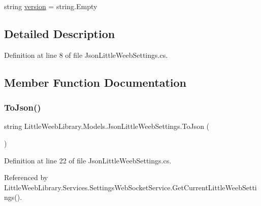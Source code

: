 \begin{DoxyCompactItemize}
\item 
string \mbox{\hyperlink{class_little_weeb_library_1_1_models_1_1_json_little_weeb_settings_adefa3710a72bdd1e1c864479218f0614}{version}} = string.\+Empty
\end{DoxyCompactItemize}


\subsection{Detailed Description}


Definition at line 8 of file Json\+Little\+Weeb\+Settings.\+cs.



\subsection{Member Function Documentation}
\mbox{\label{class_little_weeb_library_1_1_models_1_1_json_little_weeb_settings_afb2de66338da820dca2c6c6703008a82}} 
\subsubsection{\texorpdfstring{To\+Json()}{ToJson()}}
{\footnotesize\ttfamily string Little\+Weeb\+Library.\+Models.\+Json\+Little\+Weeb\+Settings.\+To\+Json (\begin{DoxyParamCaption}{ }\end{DoxyParamCaption})}



Definition at line 22 of file Json\+Little\+Weeb\+Settings.\+cs.



Referenced by Little\+Weeb\+Library.\+Services.\+Settings\+Web\+Socket\+Service.\+Get\+Current\+Little\+Weeb\+Settings().


